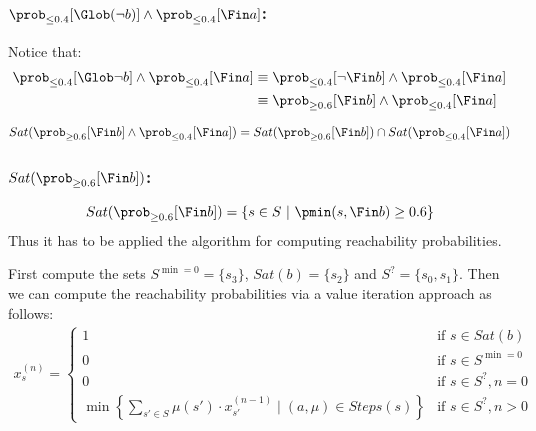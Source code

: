 \subsubsection*{$\prob_{\le 0.4}  [\Glob (\neg b)] \wedge \prob_{\le 0.4} [\Fin a]$:}

Notice that:
\begin{align*}
	\prob_{\le 0.4}  [\Glob \neg b] \wedge \prob_{\le 0.4} [\Fin a]
	 & \equiv \prob_{\le 0.4}  [\neg \Fin b] \wedge \prob_{\le 0.4} [\Fin a] \\
	 & \equiv \prob_{\ge 0.6}  [\Fin b] \wedge \prob_{\le 0.4} [\Fin a]
\end{align*}

\begin{align*}
	Sat(\prob_{\ge 0.6}  [\Fin b] \wedge \prob_{\le 0.4} [\Fin a]) = Sat(\prob_{\ge 0.6} [\Fin b]) \cap Sat(\prob_{\le 0.4} [\Fin a])
\end{align*}

\subsubsection*{$Sat(\prob_{\ge 0.6}  [\Fin b])$:}
\[
	Sat(\prob_{\ge 0.6}  [\Fin b]) = \{s \in S\ |\ \pmin(s, \Fin b) \ge 0.6\}
\]
Thus it has to be applied the algorithm for computing reachability
probabilities.

First compute the sets $S^{\min=0} = \{s_3\}$, $Sat(b) = \{ s_2 \}$ and $S^? = \{ s_0, s_1 \}$.
Then we can compute the reachability probabilities via a value iteration
approach as follows:
\begin{align*}
	x_s^{(n)} =
	\begin{cases}
		1                                                                                                   & \text{if } s \in Sat(b)     \\
		0                                                                                                   & \text{if } s \in S^{\min=0} \\
		0                                                                                                   & \text{if } s \in S^?, n = 0 \\
		\min \left\{ \sum\limits_{s' \in S} \mu(s')\cdot x_{s'}^{(n-1)} \mid (a, \mu) \in Steps(s) \right\} & \text{if } s \in S^?, n > 0
	\end{cases}
\end{align*}

